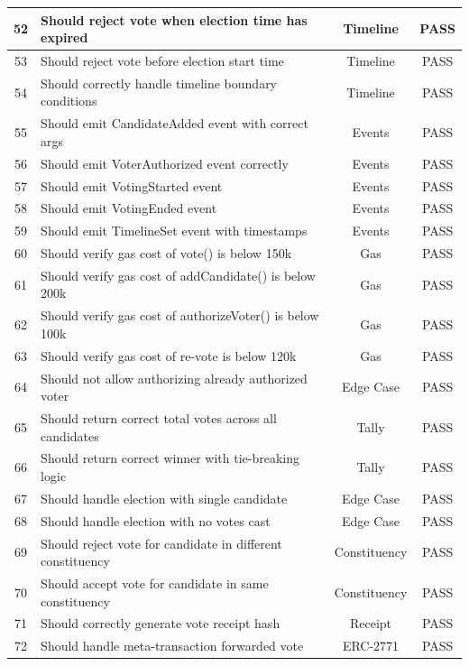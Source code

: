 \documentclass[oneside,a4paper,12pt]{book}
\begin{document}
\begin{longtable}{|c|p{8.5cm}|c|c|}
\hline
52 & Should reject vote when election time has expired & Timeline & \textcolor{green!60!black}{PASS} \\
\hline
53 & Should reject vote before election start time & Timeline & \textcolor{green!60!black}{PASS} \\
\hline
54 & Should correctly handle timeline boundary conditions & Timeline & \textcolor{green!60!black}{PASS} \\
\hline
55 & Should emit CandidateAdded event with correct args & Events & \textcolor{green!60!black}{PASS} \\
\hline
56 & Should emit VoterAuthorized event correctly & Events & \textcolor{green!60!black}{PASS} \\
\hline
57 & Should emit VotingStarted event & Events & \textcolor{green!60!black}{PASS} \\
\hline
58 & Should emit VotingEnded event & Events & \textcolor{green!60!black}{PASS} \\
\hline
59 & Should emit TimelineSet event with timestamps & Events & \textcolor{green!60!black}{PASS} \\
\hline
60 & Should verify gas cost of vote() is below 150k & Gas & \textcolor{green!60!black}{PASS} \\
\hline
61 & Should verify gas cost of addCandidate() is below 200k & Gas & \textcolor{green!60!black}{PASS} \\
\hline
62 & Should verify gas cost of authorizeVoter() is below 100k & Gas & \textcolor{green!60!black}{PASS} \\
\hline
63 & Should verify gas cost of re-vote is below 120k & Gas & \textcolor{green!60!black}{PASS} \\
\hline
64 & Should not allow authorizing already authorized voter & Edge Case & \textcolor{green!60!black}{PASS} \\
\hline
65 & Should return correct total votes across all candidates & Tally & \textcolor{green!60!black}{PASS} \\
\hline
66 & Should return correct winner with tie-breaking logic & Tally & \textcolor{green!60!black}{PASS} \\
\hline
67 & Should handle election with single candidate & Edge Case & \textcolor{green!60!black}{PASS} \\
\hline
68 & Should handle election with no votes cast & Edge Case & \textcolor{green!60!black}{PASS} \\
\hline
69 & Should reject vote for candidate in different constituency & Constituency & \textcolor{green!60!black}{PASS} \\
\hline
70 & Should accept vote for candidate in same constituency & Constituency & \textcolor{green!60!black}{PASS} \\
\hline
71 & Should correctly generate vote receipt hash & Receipt & \textcolor{green!60!black}{PASS} \\
\hline
72 & Should handle meta-transaction forwarded vote & ERC-2771 & \textcolor{green!60!black}{PASS} \\
\hline
\end{longtable}
\end{document}
